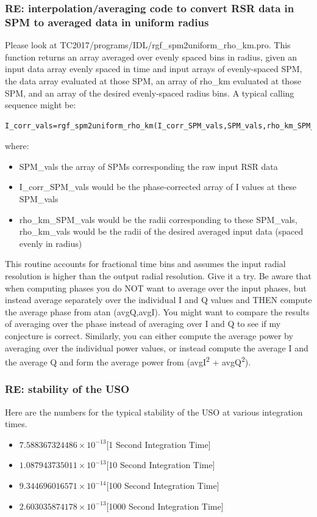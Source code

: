 \documentclass[crop=false,class=article,oneside]{standalone}
\begin{document}
\subsubsection{\footnotesize RE: interpolation/averaging code to convert RSR data in SPM to averaged data in uniform radius}
Please look at TC2017/programs/IDL/rgf\_spm2uniform\_rho\_km.pro. This function returns an array averaged over evenly spaced bins in radius, given an input data array evenly spaced in time and input arrays of evenly-spaced SPM, the data array evaluated at those SPM, an array of rho\_km evaluated at those SPM, and an array of the desired evenly-spaced radius bins. A typical calling sequence might be:
\begin{lstlisting}[language=IDL]
I_corr_vals=rgf_spm2uniform_rho_km(I_corr_SPM_vals,SPM_vals,rho_km_SPM_vals,rho_km_vals)
\end{lstlisting}
where:
\begin{itemize}
    \item SPM\_vals the array of SPMs corresponding the raw input RSR data
    \item I\_corr\_SPM\_vals would be the phase-corrected array of I values at these SPM\_vals
    \item rho\_km\_SPM\_vals would be the radii corresponding to these SPM\_vals,
    rho\_km\_vals would be the radii of the desired averaged input data (spaced evenly in radius)
\end{itemize}
This routine accounts for fractional time bins and assumes the input radial resolution is higher than the output radial resolution. Give it a try. Be aware that when computing phases you do NOT want to average over the input phases, but instead average separately over the individual I and Q values  and THEN compute the average phase from atan (avgQ,avgI). You might want to compare the results of averaging over the phase instead of averaging over I and Q to see if my conjecture is correct. Similarly, you can either compute the average power by averaging over the individual power values, or instead compute the average I and the average Q and form the average power from (avgI\textsuperscript{2} + avgQ\textsuperscript{2}).
\subsubsection{\footnotesize RE: stability of the USO}
Here are the numbers for the typical stability of the USO at various integration times.
\begin{itemize}
    \item $7.588367324486\times 10^{-13}$\hfill [1 Second Integration Time]
    \item $1.087943735011\times 10^{-13}$\hfill [10 Second Integration Time]
    \item $9.344696016571\times 10^{-14}$\hfill [100 Second Integration Time]
    \item $2.603035874178\times 10^{-13}$\hfill [1000 Second Integration Time]
\end{itemize}
\end{document}
